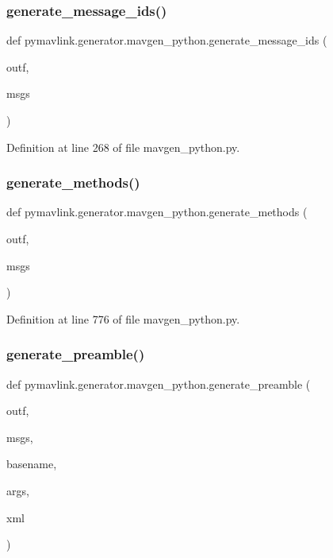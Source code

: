\subsubsection{\texorpdfstring{generate\_message\_ids()}{generate\_message\_ids()}}
{\footnotesize\ttfamily def pymavlink.\+generator.\+mavgen\+\_\+python.\+generate\+\_\+message\+\_\+ids (\begin{DoxyParamCaption}\item[{}]{outf,  }\item[{}]{msgs }\end{DoxyParamCaption})}



Definition at line 268 of file mavgen\+\_\+python.\+py.

\mbox{\label{namespacepymavlink_1_1generator_1_1mavgen__python_ab461b369bfa4a880e2211f4d574450e5}} 
\subsubsection{\texorpdfstring{generate\_methods()}{generate\_methods()}}
{\footnotesize\ttfamily def pymavlink.\+generator.\+mavgen\+\_\+python.\+generate\+\_\+methods (\begin{DoxyParamCaption}\item[{}]{outf,  }\item[{}]{msgs }\end{DoxyParamCaption})}



Definition at line 776 of file mavgen\+\_\+python.\+py.

\mbox{\label{namespacepymavlink_1_1generator_1_1mavgen__python_a780f486d09315a450a465f7a80ab0041}} 
\subsubsection{\texorpdfstring{generate\_preamble()}{generate\_preamble()}}
{\footnotesize\ttfamily def pymavlink.\+generator.\+mavgen\+\_\+python.\+generate\+\_\+preamble (\begin{DoxyParamCaption}\item[{}]{outf,  }\item[{}]{msgs,  }\item[{}]{basename,  }\item[{}]{args,  }\item[{}]{xml }\end{DoxyParamCaption})}



